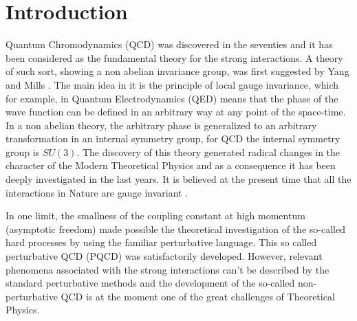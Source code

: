\documentclass[12pt,letterpaper]{report}
\begin{document}
\tableofcontents

\chapter{Introduction}

Quantum Chromodynamics (QCD) was discovered in the seventies and
it has been considered as the fundamental theory for the strong
interactions. A theory of such sort, showing a non abelian
invariance group, was first suggested by Yang and Mills
\cite{Yang}. The main idea in it is the principle of local gauge
invariance, which for example, in Quantum Electrodynamics (QED)
means that the phase of the wave function can be defined in an
arbitrary way at any point of the space-time. In a non abelian
theory, the arbitrary phase is generalized to an arbitrary
transformation in an internal symmetry group, for QCD the internal
symmetry group is $SU(3)$. The discovery of this theory generated
radical changes in the character of the Modern Theoretical Physics
and as a consequence it has been deeply investigated in the last
years. It is believed at the present time that all the
interactions in Nature are gauge invariant \cite{Green}.

In one limit, the smallness of the coupling constant at high
momentum (asymptotic freedom) made possible the theoretical
investigation of the so-called hard processes by using the
familiar perturbative language. This so called perturbative QCD
(PQCD) was satisfactorily developed. However, relevant phenomena
associated with the strong interactions can't be described by the
standard perturbative methods and the development of the so-called
non-perturbative QCD is at the moment one of the great challenges
of Theoretical Physics.
\end{document}
